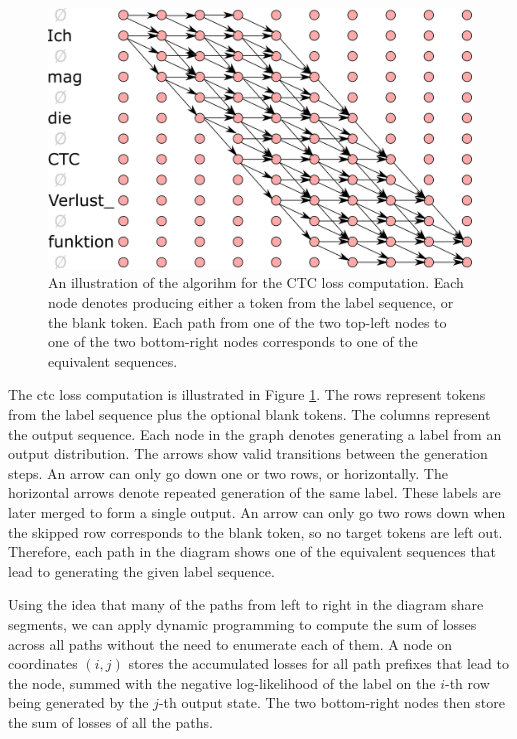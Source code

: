 \begin{figure}
  \centering

  \includegraphics[width=13cm]{img/ctc_schema.png}

  \caption{An illustration of the algorihm for the CTC loss computation. Each
    node denotes producing either a token from the label sequence, or the blank
    token. Each path from one of the two top-left nodes to one of the two
    bottom-right nodes corresponds to one of the equivalent sequences.  }
  \label{fig:ctc-dynamic-programming}
\end{figure}

The \ac{ctc} loss computation is illustrated in Figure
\ref{fig:ctc-dynamic-programming}. The rows represent tokens from the label
sequence plus the optional blank tokens. The columns represent the output
sequence.  Each node in the graph denotes generating a label from an output
distribution. The arrows show valid transitions between the generation
steps. An arrow can only go down one or two rows, or horizontally.  The
horizontal arrows denote repeated generation of the same label. These labels
are later merged to form a single output. An arrow can only go two rows down
when the skipped row corresponds to the blank token, so no target tokens are
left out. Therefore, each path in the diagram shows one of the equivalent
sequences that lead to generating the given label sequence.

Using the idea that many of the paths from left to right in the diagram share
segments, we can apply dynamic programming to compute the sum of losses across
all paths without the need to enumerate each of them. A node on coordinates
$(i,j)$ stores the accumulated losses for all path prefixes that lead to the
node, summed with the negative log-likelihood of the label on the $i$-th row
being generated by the $j$-th output state. The two bottom-right nodes then
store the sum of losses of all the paths.

